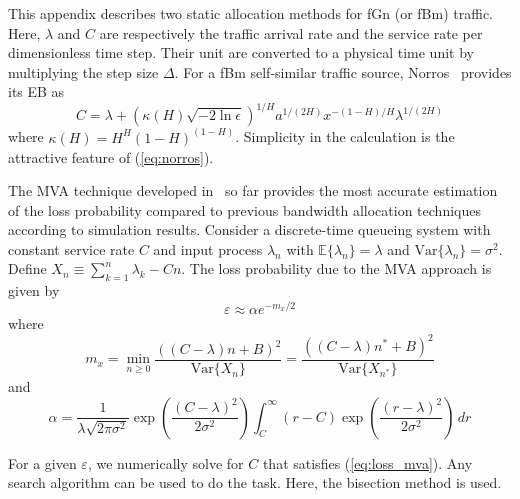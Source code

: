 \documentclass[12pt,oneside,openright,a4paper]{cpe-thai-project}
\begin{document}
This appendix describes two static allocation methods for fGn (or fBm)
traffic. Here, $\lambda$ and $C$ are respectively the traffic arrival
rate and the service rate per dimensionless time step. Their unit are
converted to a physical time unit by multiplying the step size
$\Delta$. For a fBm self-similar traffic source,
Norros~\cite{norros95} provides its EB as
\begin{equation}\label{eq:norros}
  C = \lambda + (\kappa(H)\sqrt{-2\ln\epsilon})^{1/H}a^{1/(2H)}x^{-(1-H)/H}\lambda^{1/(2H)}
\end{equation}
where $\kappa(H) = H^H(1-H)^{(1-H)}$. Simplicity in the calculation is
the attractive feature of (\ref{eq:norros}).

The MVA technique developed in~\cite{kim01} so far provides the most
accurate estimation of the loss probability compared to previous
bandwidth allocation techniques according to simulation results.
Consider a discrete-time queueing system with constant service rate
$C$ and input process $\lambda_n$ with $\mathbb{E}\{\lambda_n\} =
\lambda$ and $\mathrm{Var}\{\lambda_n\} = \sigma^2$.  Define $X_n \equiv
\sum_{k=1}^n \lambda_k - Cn$.  The loss probability due to the MVA
approach is given by
\begin{equation}\label{eq:loss_mva}
  \varepsilon \approx \alpha e^{-m_x/2}
\end{equation}
where
\begin{equation}\label{eq:mx}
m_x = \min_{n \geq 0} \frac{((C-\lambda)n + B)^2}{\mathrm{Var}\{X_n\}} =
\frac{((C-\lambda)n^\ast + B)^2}{\mathrm{Var}\{X_{n^{\ast}}\}}
\end{equation} 
and 
\begin{equation}\label{eq:alpha}
  \alpha =
  \frac{1}{\lambda\sqrt{2\pi\sigma^2}}\exp\left(\frac{(C-\lambda)^2}{2\sigma^2}\right)
  \int_C^\infty (r-C)\exp\left(\frac{(r-\lambda)^2}{2\sigma^2}\right)\, dr
\end{equation}

For a given $\varepsilon$, we numerically solve for $C$ that satisfies
(\ref{eq:loss_mva}). Any search algorithm can be used to do the task.
Here, the bisection method is used.  
\end{document}
